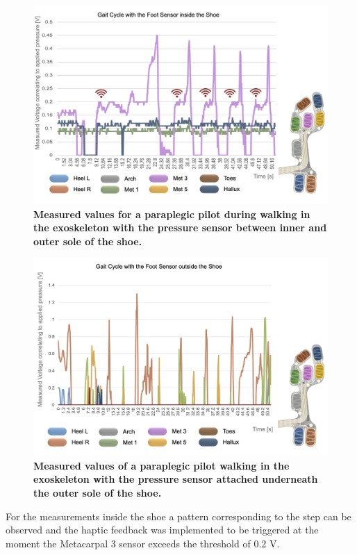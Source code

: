 \documentclass[conference,a4paper]{IEEEtran}
\begin{document}
\begin{figure}[!t]
	\centering
	\includegraphics[width=1\columnwidth]{Images/Results/Gait_Cycle_2}
	\caption{\textbf{Measured values for a paraplegic pilot during walking in the exoskeleton with the pressure sensor between inner and outer sole of the shoe.}}
	\label{Gait_Cycle_2}
\end{figure}
\begin{figure}[!t]
	\centering
	\includegraphics[width=1\columnwidth]{Images/Results/Gait_Cycle_3}
	\caption{\textbf{Measured values of a paraplegic pilot walking in the exoskeleton with the pressure sensor attached underneath the outer sole of the shoe.}}
	\label{Gait_Cycle_3}
\end{figure}
For the measurements inside the shoe a pattern corresponding to the step can be observed and the haptic feedback was implemented to be triggered at the moment the Metacarpal 3 sensor exceeds the threshold of 0.2 V.
\end{document}
